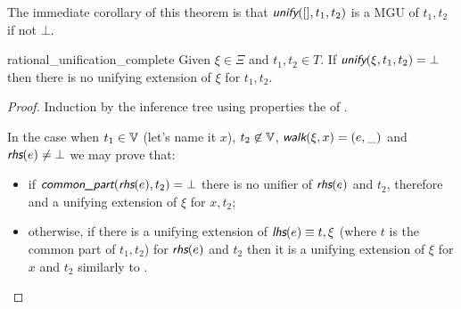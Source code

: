 The immediate corollary of this theorem is that $\unify([], t_1, t_2)$ is a MGU of $t_1, t_2$ if not $\bot$.

\begin{rocqtheorem}{rational_unification_complete}
    Given $\xi \in \Xi$ and $t_1, t_2 \in T$. If $\unify(\xi, t_1, t_2) = \bot$ then there is no unifying extension of $\xi$ for $t_1, t_2$.
\end{rocqtheorem}
\begin{proof}
    Induction by the inference tree using properties the of \union.

    In the case when $t_1 \in \mathbb{V}$ (let's name it $x$), $t_2 \not\in \mathbb{V}$, $\walk(\xi, x) = (e, \_)$ and $\rhs(e) \neq \bot$ we may prove that:
    \begin{itemize}
        \item if $\commonpart(\rhs(e), t_2) = \bot$ there is no unifier of $\rhs(e)$ and $t_2$, therefore and a unifying extension of $\xi$ for $x, t_2$;
        \item otherwise, if there is a unifying extension of $\lhs(e) \equiv t, \xi$ (where $t$ is the common part of $t_1, t_2$) for $\rhs(e)$ and $t_2$ then it is a unifying extension of $\xi$ for $x$ and $t_2$ similarly to \union.
    \end{itemize}
\end{proof}

